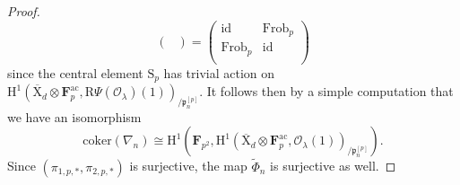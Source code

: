 \documentclass[10pt]{amsart}
\numberwithin{equation}{section}
\theoremstyle{plain}
\numberwithin{equation}{section}
\theoremstyle{definition}
\theoremstyle{remark}
\def\coker{\mathrm{coker}}
\def\Frob{\mathrm{Frob}}
\def\ac{\mathrm{ac}}
\def\ac{\mathrm{ac}}
\def\calO{\mathcal{O}}
\def\frakp{\mathfrak{p}}
\def\FF{\mathbf{F}}
\def\rmH{\mathrm{H}}
\def\rmX{\mathrm{X}}
\def\rmXbar{\overline{\rmX}}
\def\rmR{\mathrm{R}}
\def\rmS{\mathrm{S}}
\begin{document}
\begin{proof}
\begin{equation*}
\begin{pmatrix}
\end{pmatrix}=
\begin{pmatrix}
\mathrm{id} &   \Frob_{p}\\
\Frob_{p} & \mathrm{id}\\ 
\end{pmatrix}
\end{equation*}
since the central element $\rmS_{p}$ has trivial action on $\rmH^{1}(\rmXbar_{d}\otimes{\FF^{\ac}_{p}},\rmR\Psi(\calO_{\lambda})(1))_{/\frakp^{[p]}_{n}}$. It follows then by a simple computation that we have an isomorphism
\begin{equation*}
\coker(\nabla_{n})\cong \rmH^{1}(\FF_{p^{2}}, \rmH^{1}(\rmXbar_{d}\otimes{\FF^{\ac}_{p}}, \calO_{\lambda}(1))_{/\frakp^{[p]}_{n}}).
\end{equation*}
Since  $({\pi_{1,p,*}, \pi_{2,p,*}})$ is surjective, the map  $\widetilde{\Phi}_{n}$  is surjective as well. 


\end{proof}
\end{document}
